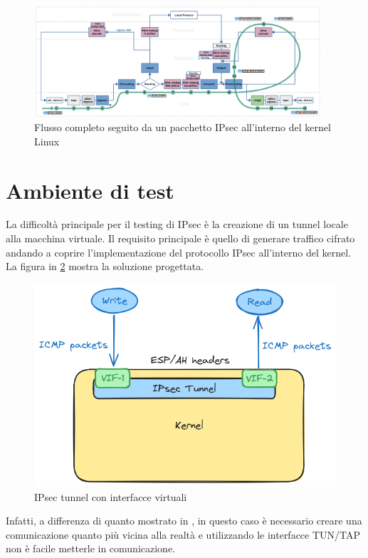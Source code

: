 \documentclass{article}
\begin{document}
\begin{figure}[h]
  \begin{center}
    \includegraphics[width=0.95\textwidth]{figures/packet-flow-ipsec-tunnel-encrypt.png}
  \end{center}
  \caption{Flusso completo seguito da un pacchetto IPsec all'interno del kernel Linux}\label{fig:packetflow-esp}
\end{figure}


\clearpage
\section{Ambiente di test}
La difficoltà principale per il testing di IPsec è la creazione di un tunnel locale alla 
macchina virtuale. Il requisito principale è quello di generare traffico cifrato andando 
a coprire l'implementazione del protocollo IPsec all'interno del kernel. La figura in 
\cref{fig:basic-idea}
mostra la soluzione progettata.

\begin{figure}[h]
  \begin{center}
    \includegraphics[width=.7\textwidth]{figures/basic-idea.png}
  \end{center}
  \caption{IPsec tunnel con interfacce virtuali}\label{fig:basic-idea}
\end{figure}
Infatti, a differenza di quanto mostrato in \cite{SyzkallerExternalNetworking}, in 
questo caso è necessario creare una comunicazione quanto più vicina alla realtà e utilizzando 
le interfacce TUN/TAP non è facile metterle in comunicazione.
\end{document}
